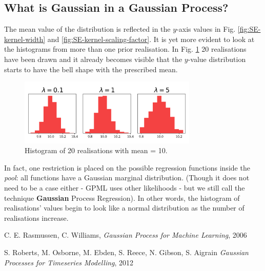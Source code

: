 \documentclass[10pt,twocolumn]{article}
\begin{document}
\subsection{What is Gaussian in a Gaussian Process?}

The mean value of the distribution is reflected in the $y$-axis values in Fig. \ref{fig:SE-kernel-width} and \ref{fig:SE-kernel-scaling-factor}. It is yet more evident to look at the histograms from more than one prior realisation. In Fig. \ref{fig:realisation-histogram} 20 realisations have been drawn and it already becomes visible that the $y$-value distribution starts to have the bell shape with the prescribed mean.


\begin{figure}[H]
\centering\includegraphics[width=8.5cm]{realisation-Histogram-tex.png}
\caption{Histogram of 20 realisations with mean = 10.}
\label{fig:realisation-histogram}
\end{figure}


In fact, one restriction is placed on the possible regression functions inside the
\textit{pool}: all functions have a Gaussian marginal distribution. (Though it does not need to be a case either - GPML uses other likelihoods - but we still call the technique \textbf{Gaussian} Process Regression). In other words, the histogram of realisations' values begin to look like a normal distribution as the number of realisations increase.















\thebibliography{}

 C. E. Rasmussen, C. Williams, \textit{Gaussian Process for Machine Learning}, 2006

 S. Roberts, M. Osborne, M. Ebden, S. Reece, N. Gibson, S. Aigrain \textit{Gaussian Processes for Timeseries Modelling}, 2012
\end{document}
